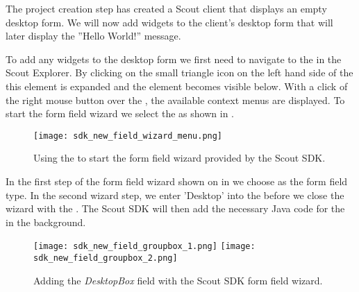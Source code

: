 %

The project creation step has created a Scout client that displays an empty desktop form.
We will now add widgets to the client's desktop form that will later display the ''Hello World!'' message.

To add any widgets to the desktop form we first need to navigate to the  in the Scout Explorer.
By clicking on the small triangle icon on the left hand side of the  this element is expanded and the  element becomes visible below.
With a click of the right mouse button over the , the available context menus are displayed.
To start the form field wizard we select the  as shown in .

\begin{figure}
\texttt{[image: sdk\_new\_field\_wizard\_menu.png]} 
\caption{Using the  to start the form field wizard provided by the Scout SDK.}
\end{figure}


In the first step of the form field wizard shown on in  we choose  as the form field type.
In the second wizard step, we enter 'Desktop' into the  before we close the wizard with the .
The Scout SDK will then add the necessary Java code for the  in the background.

\begin{figure}
\texttt{[image: sdk\_new\_field\_groupbox\_1.png]} \hspace{8mm}
\texttt{[image: sdk\_new\_field\_groupbox\_2.png]}
\caption{Adding the \textit{DesktopBox} field with the Scout SDK form field wizard.}
\end{figure}

